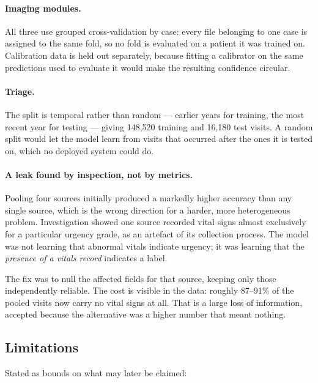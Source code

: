 \paragraph{Imaging modules.} All three use grouped cross-validation by case: every file
belonging to one case is assigned to the same fold, so no fold is evaluated on a patient it
was trained on. Calibration data is held out separately, because fitting a calibrator on the
same predictions used to evaluate it would make the resulting confidence circular.

\paragraph{Triage.} The split is temporal rather than random --- earlier years for training,
the most recent year for testing --- giving 148{,}520 training and 16{,}180 test visits. A
random split would let the model learn from visits that occurred after the ones it is tested
on, which no deployed system could do.

\paragraph{A leak found by inspection, not by metrics.} Pooling four sources initially
produced a markedly higher accuracy than any single source, which is the wrong direction for
a harder, more heterogeneous problem. Investigation showed one source recorded vital signs
almost exclusively for a particular urgency grade, as an artefact of its collection process.
The model was not learning that abnormal vitals indicate urgency; it was learning that the
\emph{presence of a vitals record} indicates a label.

The fix was to null the affected fields for that source, keeping only those independently
reliable. The cost is visible in the data: roughly 87--91\% of the pooled visits now carry no
vital signs at all. That is a large loss of information, accepted because the alternative was
a higher number that meant nothing.

\subsection{Limitations}
\label{subsec:data-limits}

Stated as bounds on what may later be claimed:

